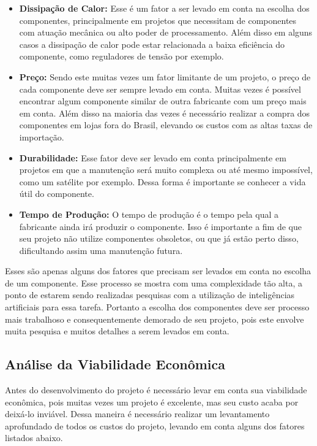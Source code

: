 \begin{itemize}
    \item \textbf{Dissipação de Calor:}
    Esse é um fator a ser levado em conta na escolha dos componentes, principalmente em projetos que necessitam de componentes com atuação mecânica ou alto poder de processamento. Além disso em alguns casos a  dissipação de calor pode estar relacionada a baixa eficiência do componente, como reguladores de tensão por exemplo.
    \item \textbf{Preço:}
    Sendo este muitas vezes um fator limitante de um projeto, o preço de cada componente deve ser sempre levado em conta. Muitas vezes é possível encontrar algum componente similar de outra fabricante com um preço mais em conta. Além disso na maioria das vezes é necessário realizar a compra dos componentes em lojas fora do Brasil, elevando os custos com as altas taxas de importação.
    \item \textbf{Durabilidade:}
    Esse fator deve ser levado em conta principalmente em projetos em que a manutenção será muito complexa ou até mesmo impossível, como um satélite por exemplo. Dessa forma é importante se conhecer a vida útil do componente. 
    \item \textbf{Tempo de Produção:}
    O tempo de produção é o tempo pela qual a fabricante ainda irá produzir o componente. Isso é importante a fim de que seu projeto não utilize componentes obsoletos, ou que já estão perto disso, dificultando assim uma manutenção futura.
\end{itemize}

Esses são apenas alguns dos fatores que precisam ser levados em conta no escolha de um componente. Esse processo se mostra com uma complexidade tão alta, a ponto de estarem sendo realizadas pesquisas com a utilização de inteligências artificiais para essa tarefa.  Portanto a escolha dos componentes deve ser processo mais trabalhoso e consequentemente demorado de seu projeto, pois este envolve muita pesquisa e muitos detalhes a serem levados em conta.

\subsection{Análise da Viabilidade Econômica }

Antes do desenvolvimento do projeto é necessário levar em conta sua viabilidade econômica, pois muitas vezes um projeto é excelente, mas seu custo acaba por deixá-lo inviável. Dessa maneira é necessário realizar um levantamento aprofundado de todos os custos do projeto, levando em conta alguns dos fatores listados abaixo.


